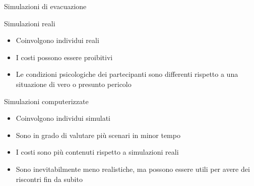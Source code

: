 \documentclass{beamer}
\begin{document}
\begin{frame}{Simulazioni di evacuazione}
\begin{block}{Simulazioni reali}
\begin{itemize}
    \item Coinvolgono individui reali
    \item I costi possono essere proibitivi
    \item Le condizioni psicologiche dei partecipanti sono differenti rispetto a una situazione di vero o presunto pericolo
\end{itemize}
\end{block}
\begin{block}{Simulazioni computerizzate}
\begin{itemize}
    \item Coinvolgono individui simulati
    \item Sono in grado di valutare più scenari in minor tempo
    \item I costi sono più contenuti rispetto a simulazioni reali
    \item Sono inevitabilmente meno realistiche, ma possono essere utili per avere dei riscontri fin da subito
\end{itemize}
\end{block}
\end{frame}
\end{document}
